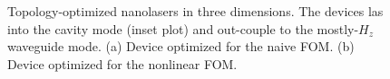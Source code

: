 \begin{figure}[tb]
    \centering
    \caption{Topology-optimized nanolasers in three dimensions. The devices las into the cavity mode (inset plot) and out-couple to the
    mostly-$H_z$ waveguide mode. (a) Device optimized for the naive FOM. (b) Device optimized for the nonlinear FOM.}
    \label{fig:laser3d}
\end{figure}
